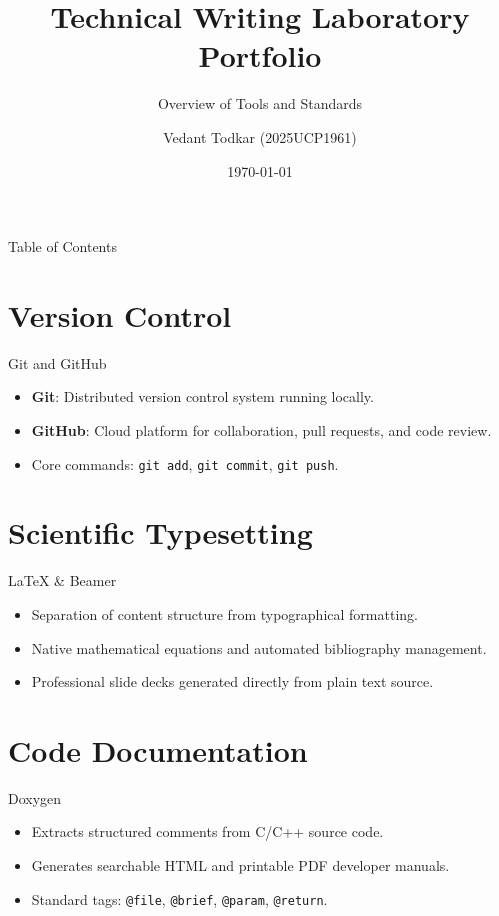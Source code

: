 \documentclass{beamer}
\title{Technical Writing Laboratory Portfolio}
\subtitle{Overview of Tools and Standards}
\author{Vedant Todkar (2025UCP1961)}
\institute{MNIT Jaipur}
\date{\today}
\begin{document}
\begin{frame}
  \titlepage
\end{frame}

\begin{frame}{Table of Contents}
  \tableofcontents
\end{frame}

\section{Version Control}
\begin{frame}{Git and GitHub}
  \begin{itemize}
    \item \textbf{Git}: Distributed version control system running locally.
    \item \textbf{GitHub}: Cloud platform for collaboration, pull requests, and code review.
    \item Core commands: \texttt{git add}, \texttt{git commit}, \texttt{git push}.
  \end{itemize}
\end{frame}

\section{Scientific Typesetting}
\begin{frame}{LaTeX \& Beamer}
  \begin{itemize}
    \item Separation of content structure from typographical formatting.
    \item Native mathematical equations and automated bibliography management.
    \item Professional slide decks generated directly from plain text source.
  \end{itemize}
\end{frame}

\section{Code Documentation}
\begin{frame}{Doxygen}
  \begin{itemize}
    \item Extracts structured comments from C/C++ source code.
    \item Generates searchable HTML and printable PDF developer manuals.
    \item Standard tags: \texttt{@file}, \texttt{@brief}, \texttt{@param}, \texttt{@return}.
  \end{itemize}
\end{frame}
\end{document}

